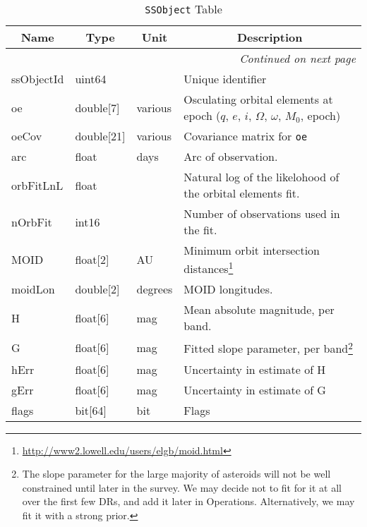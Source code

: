 \documentclass[12pt]{article}
\newcommand{\code}[1]{\texttt{#1}}
\newcommand{\SSObject}{\code{SSObject}\xspace}
\begin{document}
\begin{center}
\begin{longtable}{p{3cm}p{2cm}p{2cm}p{5cm}}
\caption[\SSObject Table]{\SSObject Table} \\

\hline \multicolumn{1}{c}{\bf Name} & \multicolumn{1}{c}{\bf Type} & \multicolumn{1}{c}{\bf Unit} & \multicolumn{1}{c}{\bf Description} \\ \hline
\endhead

\hline \multicolumn{4}{r}{{\em Continued on next page}} \\
\endfoot

\hline\hline
\endlastfoot

ssObjectId & uint64 & ~ & Unique identifier \\ 

oe & double[7] & various & Osculating orbital elements at epoch ($q$, $e$, $i$, $\Omega$, $\omega$, $M_0$, epoch) \\

oeCov & double[21] & various & Covariance matrix for \texttt{oe} \\

arc & float & days & Arc of observation. \\

orbFitLnL & float & ~ & Natural log of the likelohood of the orbital elements fit. \\

nOrbFit & int16 & ~ & Number of observations used in the fit. \\

MOID & float[2] & AU & Minimum orbit intersection distances\footnote{\url{http://www2.lowell.edu/users/elgb/moid.html}} \\

moidLon & double[2] & degrees & MOID longitudes. \\

H & float[6] & mag & Mean absolute magnitude, per band. \\

G & float[6] & mag & Fitted slope parameter, per band\footnote{The slope parameter for the large majority of asteroids will not be well constrained until later in the survey. We may decide not to fit for it at all over the first few DRs, and add it later in Operations. Alternatively, we may fit it with a strong prior.} \\

hErr & float[6] & mag & Uncertainty in estimate of H \\

gErr & float[6] & mag & Uncertainty in estimate of G \\

flags & bit[64] & bit & Flags \\ \hline

\end{longtable}
\end{center}
\end{document}
